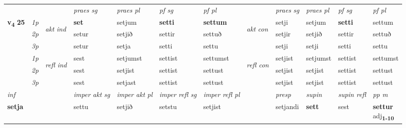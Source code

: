 \begin{longtable}[l]{X>{\footnotesize\itshape}llXXXXlXXXX}
 & &   & \textit{praes sg}  & \textit{praes pl}    & \textit{ pf sg} & \textit{pf pl} & & \textit{praes sg}  & \textit{praes pl}    & \textit{pf sg} & \textit{pf pl }  \\ \cmidrule{4-7} \cmidrule{9-12}
 \multirow{2}{*}{{{\textbf{v{\textsubscript{4}}} \Large{\textbf{25}}}}}  & 1p & \multirow{3}{*}{\begin{turn}{90}\textit{akt ind}\end{turn}} & \textbf{set} & setjum & \textbf{setti} & \textbf{settum} & \multirow{3}{*}{\begin{turn}{90}\textit{akt con}\end{turn}} &setji & setjum & \textbf{setti} & settum\\*
 & 2p &  &  setur  & setjið & settir & settuð & & setjir & setjið & settir & settuð \\*
 & 3p &  & setur & setja & setti & settu & & setji & setji& setti & settu \\*
\cmidrule{4-7} \cmidrule{9-12}
 & 1p & \multirow{3}{*}{\begin{turn}{90}\textit{refl ind}\end{turn}}  & sest & setjumst & settist & settumst & \multirow{3}{*}{\begin{turn}{90}\textit{refl con}\end{turn}}  &setjist & setjumst & settist & settumst \\*
 & 2p &  & sest & setjist & settist & settust & &setjist & setjist & settist & settust \\*
 & 3p  & & sest & setjast & settist & settust & & setjist & setjist& settist & settust \\*
\cmidrule{4-7} \cmidrule{9-12}

   {\textit{inf}} & &  & \textit{imper akt sg} & \textit{imper akt pl} & \textit{imper refl sg} & \textit{imper refl pl} && \textit{presp} & \textit{supin} & \textit{supin refl} & \textit{pp m} \\*
  {\textbf{setja}} & && settu  & setjið & setstu & setjist && setjandi &  \textbf{sett} & sest & \specialcell{\textbf{settur} \\ adj\textbf{\textsubscript{1-10}}} \\*

\midrule


\end{longtable}
